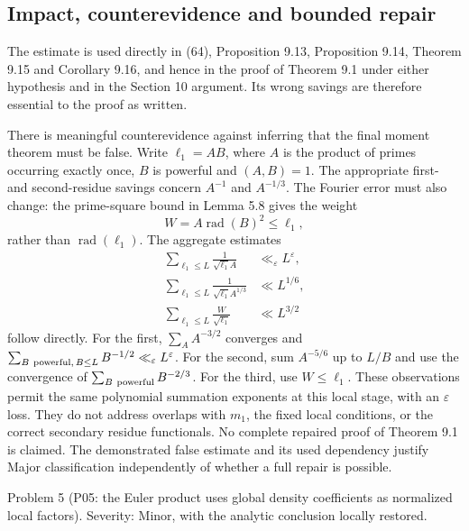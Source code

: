 \documentclass[10pt]{article}
\begin{document}
\subsection*{Impact, counterevidence and bounded repair}
The estimate is used directly in (64), Proposition 9.13, Proposition 9.14, Theorem 9.15 and Corollary 9.16, and hence in the proof of Theorem 9.1 under either hypothesis and in the Section 10 argument. Its wrong savings are therefore essential to the proof as written.\par
There is meaningful counterevidence against inferring that the final moment theorem must be false. Write \(\ell_1=AB\), where \(A\) is the product of primes occurring exactly once, \(B\) is powerful and \((A,B)=1\). The appropriate first- and second-residue savings concern \(A^{-1}\) and \(A^{-1/3}\). The Fourier error must also change: the prime-square bound in Lemma 5.8 gives the weight \[W=A\operatorname{rad}(B)^2\le\ell_1,\] rather than \(\operatorname{rad}(\ell_1)\). The aggregate estimates \[\begin{aligned}
 \sum_{\ell_1\le L}\frac1{\sqrt{\ell_1}A}
   &\ll_\varepsilon L^\varepsilon,\\
 \sum_{\ell_1\le L}\frac1{\sqrt{\ell_1}A^{1/3}}
   &\ll L^{1/6},\\
 \sum_{\ell_1\le L}\frac{W}{\sqrt{\ell_1}}
   &\ll L^{3/2}\end{aligned}\] follow directly. For the first, \(\sum_A A^{-3/2}\) converges and \(\sum_{B\ {\rm powerful},\, B\le L}B^{-1/2}\ll_\varepsilon L^\varepsilon\). For the second, sum \(A^{-5/6}\) up to \(L/B\) and use the convergence of \(\sum_{B\ {\rm powerful}}B^{-2/3}\). For the third, use \(W\le\ell_1\). These observations permit the same polynomial summation exponents at this local stage, with an \(\varepsilon\) loss. They do not address overlaps with \(m_1\), the fixed local conditions, or the correct secondary residue functionals. No complete repaired proof of Theorem 9.1 is claimed. The demonstrated false estimate and its used dependency justify Major classification independently of whether a full repair is possible.\par
Problem 5 (P05: the Euler product uses global density coefficients as normalized local factors).  Severity: Minor, with the analytic conclusion locally restored.\par
\end{document}
